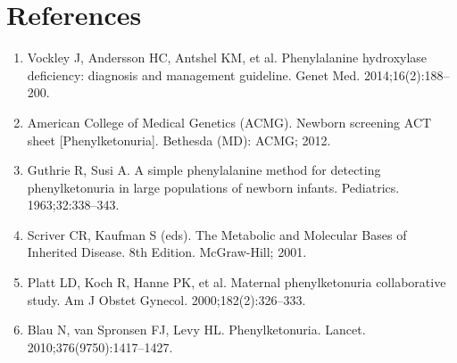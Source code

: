 \section*{References}
\begin{enumerate}
  \item Vockley J, Andersson HC, Antshel KM, et al. Phenylalanine hydroxylase deficiency: diagnosis and management guideline. Genet Med. 2014;16(2):188--200.
  \item American College of Medical Genetics (ACMG). Newborn screening ACT sheet [Phenylketonuria]. Bethesda (MD): ACMG; 2012.
  \item Guthrie R, Susi A. A simple phenylalanine method for detecting phenylketonuria in large populations of newborn infants. Pediatrics. 1963;32:338--343.
  \item Scriver CR, Kaufman S (eds). The Metabolic and Molecular Bases of Inherited Disease. 8th Edition. McGraw-Hill; 2001.
  \item Platt LD, Koch R, Hanne PK, et al. Maternal phenylketonuria collaborative study. Am J Obstet Gynecol. 2000;182(2):326--333.
  \item Blau N, van Spronsen FJ, Levy HL. Phenylketonuria. Lancet. 2010;376(9750):1417--1427.
\end{enumerate}

\clearpage
